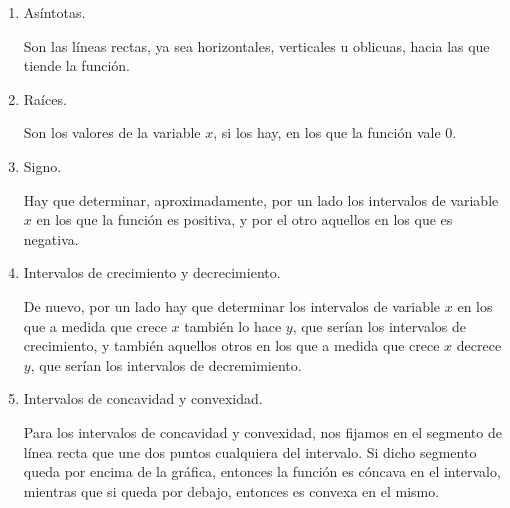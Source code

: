 \begin{enumerate}[leftmargin=*]
\begin{enumerate}
\begin{enumerate}
	      	      	\item  Asíntotas.
	      	      	      \begin{indication}
	      	      	      	Son las líneas rectas, ya sea horizontales, verticales u oblicuas, hacia las que tiende la función.
	      	      	      \end{indication}
	      	      	      
	      	      	\item  Raíces.
	      	      	      \begin{indication}
	      	      	      	Son los valores de la variable $x$, si los hay, en los que la función vale 0.
	      	      	      \end{indication}
	      	      	      
	      	      	\item Signo.
	      	      	      \begin{indication}
	      	      	      	Hay que determinar, aproximadamente, por un lado los intervalos de variable $x$ en los que la función es positiva, y por el otro aquellos en
	      	      	      	los que es negativa.
	      	      	      \end{indication}
	      	      	      
	      	      	\item  Intervalos de crecimiento y decrecimiento.
	      	      	      \begin{indication}
	      	      	      	De nuevo, por un lado hay que determinar los intervalos de variable $x$ en los que a medida que crece $x$ también lo hace $y$, que serían
	      	      	      	los intervalos de crecimiento, y también aquellos otros en los que a medida que crece $x$ decrece $y$, que serían los intervalos de
	      	      	      	decremimiento.
	      	      	      \end{indication}
	      	      	      
	      	      	\item Intervalos de concavidad y convexidad.
	      	      	      \begin{indication}
	      	      	      	Para los intervalos de concavidad y convexidad, nos fijamos en el segmento de línea recta que une dos puntos cualquiera del intervalo. Si
	      	      	      	dicho segmento queda por encima de la gráfica, entonces la función es cóncava en el intervalo, mientras que si queda por debajo, entonces es
	      	      	      	convexa en el mismo.
	      	      	      \end{indication}
	      	      	      

\end{enumerate}
\end{enumerate}
\end{enumerate}
